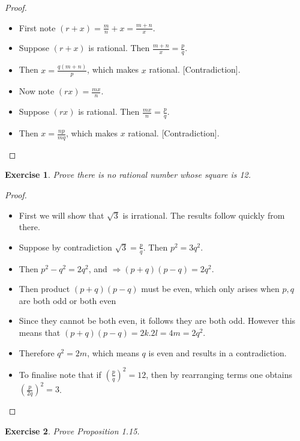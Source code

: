\documentclass[12pt]{article}
\newtheorem{exercise}{Exercise}[section]
\begin{document}
\begin{proof}

    \begin{itemize}
        \item First note $(r+x) = \frac{m}{n} + x = \frac{m+n}{x}$.
        \item Suppose $(r+x)$ is rational. Then $\frac{m+n}{x} = \frac{p}{q}$.
        \item Then $x = \frac{q(m+n)}{p}$, which makes $x$ rational. [Contradiction].
        \item Now note $(rx) = \frac{mx}{n}$.
        \item Suppose $(rx)$ is rational. Then $\frac{mx}{n} = \frac{p}{q}$.
        \item Then $x = \frac{np}{mq}$, which makes $x$ rational. [Contradiction].
    \end{itemize}

\end{proof}

\begin{exercise}
    Prove there is no rational number whose square is 12.
\end{exercise}

\begin{proof}

    \begin{itemize}
        \item First we will show that $\sqrt{3}$ is irrational. The results follow quickly from there.
        \item Suppose by contradiction $\sqrt{3} = \frac{p}{q}$. Then $p^2 = 3q^2$.
        \item Then $p^2 - q^2 = 2q^2$, and $\Rightarrow (p+q)(p-q) = 2q^2$.
        \item Then product $(p+q)(p-q)$ must be even, which only arises when $p, q$ are both odd or both even
        \item Since they cannot be both even, it follows they are both odd. However this means that $(p+q)(p-q) = 2k.2l = 4m = 2q^2$.
        \item Therefore $q^2 = 2m$, which means $q$ is even and results in a contradiction.
        \item To finalise note that if $(\frac{p}{q})^2 = 12$, then by rearranging terms one obtains $(\frac{p}{2q})^2 = 3$.
    \end{itemize}

\end{proof}

\begin{exercise}
    Prove Proposition 1.15.
\end{exercise}
\end{document}
